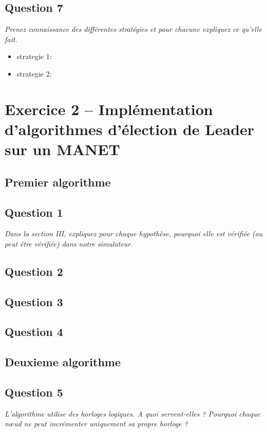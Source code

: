 \documentclass[11pt,a4paper,sans]{report}
\begin{document}
\section{Question 7}
\textit{Prenez connaissance des différentes stratégies et pour chacune expliquez ce qu’elle fait.}
\begin{itemize}
\item strategie 1:
\item strategie 2:
\end{itemize}


\newpage
\chapter{Exercice 2 – Implémentation d’algorithmes d’élection de Leader sur un MANET}
\section*{Premier algorithme}

\section{Question 1}
\textit{Dans la section III, expliquez pour chaque hypothèse, pourquoi elle est vérifiée (ou
		peut être vérifiée) dans notre simulateur.}

\section{Question 2}

\section{Question 3}

\section{Question 4}

\section*{Deuxieme algorithme}

\section{Question 5}
\textit{L’algorithme utilise des horloges logiques. A quoi servent-elles ?  Pourquoi chaque nœud ne peut incrémenter uniquement sa propre horloge ?}
\end{document}
